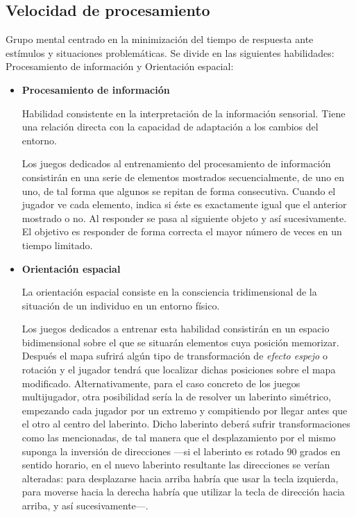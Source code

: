 \subsection{Velocidad de procesamiento}

Grupo mental centrado en la minimización del tiempo de respuesta ante estímulos y situaciones problemáticas. Se divide en las siguientes habilidades: Procesamiento de información y Orientación espacial:

\begin{itemize}

\item {\bf Procesamiento de información}

Habilidad consistente en la interpretación de la información sensorial. Tiene una relación directa con la capacidad de adaptación a los cambios del entorno.

Los juegos dedicados al entrenamiento del procesamiento de información consistirán en una serie de elementos mostrados secuencialmente, de uno en uno, de tal forma que algunos se repitan de forma consecutiva. Cuando el jugador ve cada elemento, indica si éste es exactamente igual que el anterior mostrado o no. Al responder se pasa al siguiente objeto y así sucesivamente. El objetivo es responder de forma correcta el mayor número de veces en un tiempo limitado.

\item {\bf Orientación espacial}

La orientación espacial consiste en la consciencia tridimensional de la situación de un individuo en un entorno físico.

Los juegos dedicados a entrenar esta habilidad consistirán en un espacio bidimensional sobre el que se situarán elementos cuya posición memorizar. Después el mapa sufrirá algún tipo de transformación de {\it efecto espejo} o rotación y el jugador tendrá que localizar dichas posiciones sobre el mapa modificado. Alternativamente, para el caso concreto de los juegos multijugador, otra posibilidad sería la de resolver un laberinto simétrico, empezando cada jugador por un extremo y compitiendo por llegar antes que el otro al centro del laberinto. Dicho laberinto deberá sufrir transformaciones como las mencionadas, de tal manera que el desplazamiento por el mismo suponga la inversión de direcciones ---si el laberinto es rotado 90 grados en sentido horario, en el nuevo laberinto resultante las direcciones se verían alteradas: para desplazarse hacia arriba habría que usar la tecla izquierda, para moverse hacia la derecha habría que utilizar la tecla de dirección hacia arriba, y así sucesivamente---.


\end{itemize}
